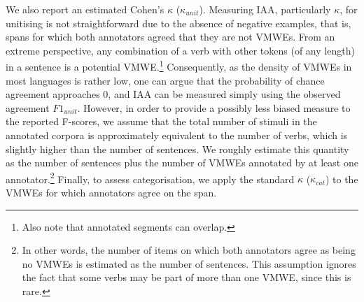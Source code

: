 \documentclass[output=paper,modfonts]{langscibook}
\begin{document}
We also report an estimated Cohen's $\kappa$ ($\kappa_{unit}$).  %
Measuring IAA, particularly $\kappa$, for unitising is not straightforward due to the absence of negative examples, that is, spans for which both annotators agreed that they are not VMWEs. From an extreme perspective, any combination of a verb with other tokens (of any length) in a sentence is a potential VMWE.\footnote{Also note that annotated segments can  overlap.} Consequently, as the density of VMWEs in most languages is rather low, one can argue that the probability of chance agreement approaches 0, %
and IAA can be measured simply using the observed agreement $F1_{unit}$. However, in order to provide 
a possibly less biased measure to the reported F-scores, we assume that the total number of stimuli in the annotated corpora is 
approximately equivalent to the number of %
verbs, which %
is slightly higher than the number of sentences. We roughly estimate this quantity as the number of sentences plus the number of VMWEs annotated by at least one annotator.\footnote{In other words, the number of items on which both annotators agree as being no VMWEs is estimated as the number of sentences. 
This assumption ignores the fact that some verbs may be part of more than one VMWE, since this is rare.} 
%
Finally, to assess categorisation, we apply the standard $\kappa$ ($\kappa_{cat}$) to the VMWEs for which annotators agree on the span. 
\end{document}
